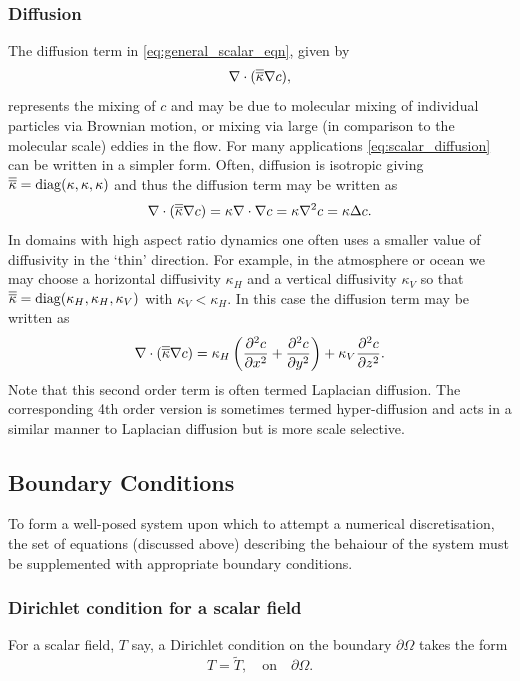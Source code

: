 \subsubsection{Diffusion}
The diffusion term in \eqref{eq:general_scalar_eqn}, given by 
\begin{equation}\label{eq:scalar_diffusion}
\nabla\cdot(\kaptens\nabla c),
\end{equation}
represents the mixing of $c$ and may be due to 
molecular mixing of individual particles via Brownian motion, or mixing via large (in comparison to the
molecular scale) eddies in the flow. For many applications \eqref{eq:scalar_diffusion} can be written in a simpler form. Often, diffusion is isotropic giving $\kaptens = \mathrm{diag}(\kappa,\kappa,\kappa)$ and thus the diffusion term
may be written as
\begin{equation}\label{eq:scalar_isotropic_diffusion}
\nabla\cdot(\kaptens\nabla c) = \kappa\nabla\cdot\nabla c = \kappa\nabla^2 c = \kappa\Delta c.
\end{equation}
In domains with high aspect ratio dynamics one often uses a smaller value of diffusivity in the `thin'
direction. For example, in the atmosphere or ocean we may choose a horizontal diffusivity $\kappa_H$ and a
vertical diffusivity $\kappa_V$ so that $\kaptens = \mathrm{diag}(\kappa_H,\kappa_H,\kappa_V)$ with $\kappa_V < \kappa_H$.
In this case the diffusion term may be written as
\begin{equation}\label{eq:scalar_anisotropic_diffusion}
\nabla\cdot(\kaptens\nabla c) = \kappa_H \left(\pptt[x]{c} + \pptt[y]{c}\right) + \kappa_V \pptt[z]{c}.
\end{equation}
Note that this second order term is often termed Laplacian diffusion. The corresponding 4th order version is sometimes
termed hyper-diffusion and acts in a similar manner to Laplacian diffusion but is more
scale selective.

\subsection{Boundary Conditions} \label{Sect:BCs}


To form a well-posed system upon which to attempt a numerical discretisation, the
set of equations (discussed above) describing the behaiour of the 
system must be supplemented with appropriate boundary conditions.


\subsubsection{Dirichlet condition for a scalar field}\label{sect:bc_scalar_dirichlet}
For a scalar field, $T$ say, a Dirichlet condition on the boundary
$\partial\Omega$ takes the form
\begin{equation*}
T=\tilde{T},\quad \textrm{on}\quad \partial\Omega.
\end{equation*}


